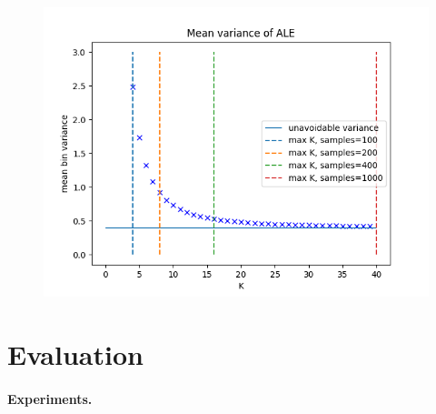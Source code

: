 \documentclass{article}
\begin{document}
\begin{figure}[!h]
  \centering
  \includegraphics[width=.7\linewidth]{./example_gromping_paper/bin_varinace.png}
  \caption{}
  \label{fig:im2}
\end{figure}


\section{Evaluation}

\paragraph{Experiments.}


\end{document}
